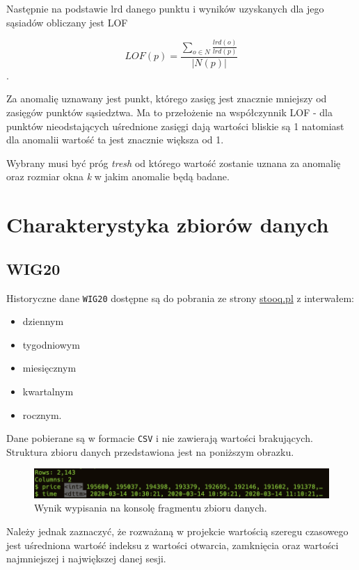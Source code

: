 \documentclass{article}
\begin{document}
Następnie na podstawie lrd danego punktu i wyników uzyskanych dla jego sąsiadów obliczany jest LOF 

\begin{equation}
    LOF(p) = \frac{\sum_{o \in N} \frac{lrd(o)}{lrd(p)}}{|N(p)|}
\end{equation}. 

Za anomalię uznawany jest punkt, którego zasięg jest znacznie mniejszy od zasięgów punktów sąsiedztwa. Ma to przełożenie na współczynnik LOF - dla punktów nieodstających uśrednione zasięgi dają wartości bliskie są 1 natomiast dla anomalii wartość ta jest znacznie większa od 1.  

Wybrany musi być próg \emph{tresh} od którego wartość zostanie uznana za anomalię oraz rozmiar okna \emph{k} w jakim anomalie będą badane. 

\section{Charakterystyka zbiorów danych \label{r5}}

\subsection{WIG20}

Historyczne dane \texttt{WIG20} dostępne są do pobrania ze strony
\href{https://stooq.pl/q/d/?s=wig20}{stooq.pl} z interwałem:

\begin{itemize}
\item
  dziennym
\item
  tygodniowym
\item
  miesięcznym
\item
  kwartalnym
\item
  rocznym.
\end{itemize}

Dane pobierane są w formacie \texttt{CSV} i nie zawierają wartości
brakujących. Struktura zbioru danych przedstawiona jest na poniższym
obrazku.

\begin{figure}[H]
  \centering
  \includegraphics[width=.75\textwidth]{./images/wt-glimpse.png}
  \caption{Wynik wypisania na konsolę fragmentu zbioru danych.}
\end{figure}

Należy jednak zaznaczyć, że rozważaną w projekcie wartością szeregu
czasowego jest uśredniona wartość indeksu z wartości otwarcia,
zamknięcia oraz wartości najmniejszej i największej danej sesji.
\end{document}

